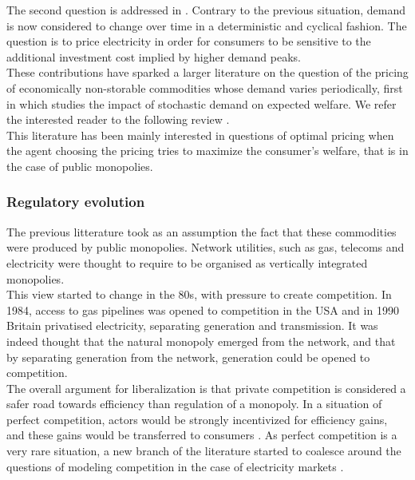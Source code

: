 The second question is addressed in \cite{boiteux1960peak}. Contrary to the previous situation, demand is now considered to change over time in a deterministic and cyclical fashion. The question is to price electricity in order for consumers to be sensitive to the additional investment cost implied by higher demand peaks. \\

These contributions have sparked a larger literature on the question of the pricing of economically non-storable commodities whose demand varies periodically, first in \cite{brown1969public} which studies the impact of stochastic demand on expected welfare. We refer the interested reader to the following review \cite{crew1995theory}. \\ 

This literature has been mainly interested in questions of optimal pricing when the agent choosing the pricing tries to maximize the consumer's welfare, that is in the case of public monopolies. \\

\subsubsection*{Regulatory evolution}
The previous litterature took as an assumption the fact that these commodities were produced by public monopolies. Network utilities, such as gas, telecoms and electricity were thought to require to be organised as vertically integrated monopolies. \\

This view started to change in the 80s, with pressure to create competition. In 1984, access to gas pipelines was opened to competition in the USA and in 1990 Britain privatised electricity, separating generation and transmission. It was indeed thought that the natural monopoly emerged from the network, and that by separating generation from the network, generation could be opened to competition. \\

The overall argument for liberalization is that private competition is considered a safer road towards efficiency than regulation of a monopoly. In a situation of perfect competition, actors would be strongly incentivized for efficiency gains, and these gains would be transferred to consumers \cite{schmidt1996costs}. As perfect competition is a very rare situation, a new branch of the literature started to coalesce around the questions of modeling competition in the case of electricity markets \cite{newbery1997privatisation}. \\

